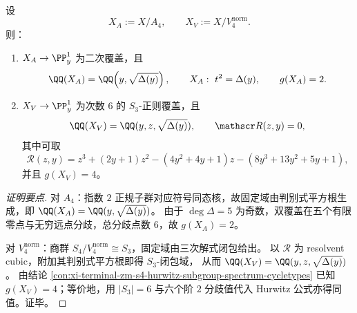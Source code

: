 \begin{conclusion}\label{con:xi-terminal-zm-s4-normal-subgroup-quotients-explicit-models-genus}
设
\[
X_A:=X/A_4,\qquad X_V:=X/V_4^{\mathrm{norm}}.
\]
则：
\begin{enumerate}
  \item \(X_A\to\PP^1_y\) 为二次覆盖，且
  \[
  \QQ(X_A)=\QQ\!\left(y,\sqrt{\Delta(y)}\right),
  \qquad
  X_A:\ t^2=\Delta(y),
  \qquad g(X_A)=2.
  \]
  \item \(X_V\to\PP^1_y\) 为次数 \(6\) 的 \(S_3\)-正则覆盖，且
  \[
  \QQ(X_V)=\QQ(y,z,\sqrt{\Delta(y)}),\qquad \mathscr R(z,y)=0,
  \]
  其中可取
  \[
  \mathscr R(z,y)=z^3+(2y+1)z^2-(4y^2+4y+1)z-(8y^3+13y^2+5y+1),
  \]
  并且 \(g(X_V)=4\)。
\end{enumerate}
\end{conclusion}
\begin{proof}[证明要点]
对 \(A_4\)：指数 \(2\) 正规子群对应符号同态核，故固定域由判别式平方根生成，即
\(
\QQ(X_A)=\QQ(y,\sqrt{\Delta(y)})
\)。
由于 \(\deg\Delta=5\) 为奇数，双覆盖在五个有限零点与无穷远点分歧，总分歧点数 \(6\)，故 \(g(X_A)=2\)。
\par
对 \(V_4^{\mathrm{norm}}\)：商群 \(S_4/V_4^{\mathrm{norm}}\cong S_3\)，固定域由三次解式闭包给出。
以 \(\mathscr R\) 为 resolvent cubic，附加其判别式平方根即得 \(S_3\)-闭包域，
从而 \(\QQ(X_V)=\QQ(y,z,\sqrt{\Delta(y)})\)。
由结论 \ref{con:xi-terminal-zm-s4-hurwitz-subgroup-spectrum-cycletypes} 已知 \(g(X_V)=4\)；等价地，用 \(|S_3|=6\) 与六个阶 \(2\) 分歧值代入 Hurwitz 公式亦得同值。证毕。
\end{proof}

